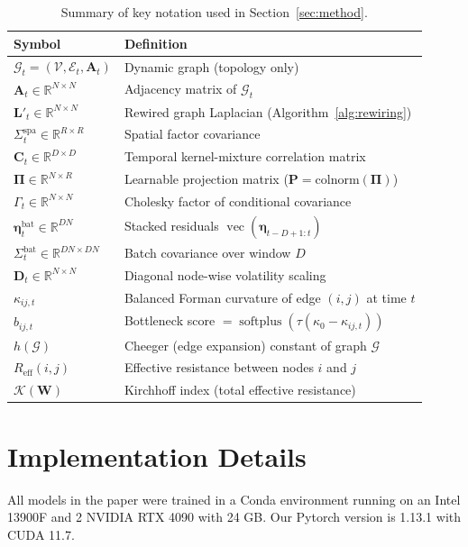 \documentclass{article}
\theoremstyle{plain}
\theoremstyle{definition}
\theoremstyle{remark}
\newcommand{\R}{\mathbb{R}}
\newcommand{\calG}{\mathcal{G}}
\newcommand{\calE}{\mathcal{E}}
\renewcommand{\vec}{\operatorname{vec}}
\begin{document}
\begin{table}[h]
\centering
\caption{Summary of key notation used in Section~\ref{sec:method}.}
\label{tab:notation}
\begin{tabular}{ll}
\toprule
Symbol & Definition \\
\midrule
$\calG_t = (\mathcal{V},\calE_t,\mathbf{A}_t)$ & Dynamic graph (topology only) \\
$\mathbf{A}_t \in \R^{N\times N}$ & Adjacency matrix of $\calG_t$ \\
$\mathbf{L}'_t \in \R^{N\times N}$ & Rewired graph Laplacian (Algorithm~\ref{alg:rewiring}) \\
$\Sigma^{\mathrm{spa}}_t \in \R^{R\times R}$ & Spatial factor covariance \\
$\mathbf{C}_t \in \R^{D\times D}$ & Temporal kernel-mixture correlation matrix \\
$\mathbf{\Pi} \in \R^{N\times R}$ & Learnable projection matrix ($\mathbf{P} = \mathrm{colnorm}(\mathbf{\Pi})$) \\
$\Gamma_t \in \R^{N\times N}$ & Cholesky factor of conditional covariance \\
$\boldsymbol{\eta}_t^{\mathrm{bat}} \in \R^{DN}$ & Stacked residuals $\vec(\boldsymbol{\eta}_{t-D+1:t})$ \\
$\Sigma_t^{\mathrm{bat}} \in \R^{DN\times DN}$ & Batch covariance over window $D$ \\
$\mathbf{D}_t \in \R^{N\times N}$ & Diagonal node-wise volatility scaling \\
$\kappa_{ij,t}$ & Balanced Forman curvature of edge $(i,j)$ at time $t$ \\
$b_{ij,t}$ & Bottleneck score $= \operatorname{softplus}(\tau(\kappa_0-\kappa_{ij,t}))$ \\
$h(\calG)$ & Cheeger (edge expansion) constant of graph $\calG$ \\
$R_{\mathrm{eff}}(i,j)$ & Effective resistance between nodes $i$ and $j$ \\
$\mathcal{K}(\mathbf{W})$ & Kirchhoff index (total effective resistance) \\
\bottomrule
\end{tabular}
\end{table}

\section{Implementation Details}
All models in the paper were trained in a Conda environment running on an Intel 13900F and 2 NVIDIA RTX 4090 with 24 GB. Our Pytorch version is 1.13.1 with CUDA 11.7.
\end{document}
